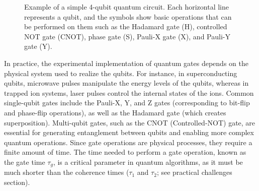 \documentclass{elbioimp2}
\begin{document}
\begin{figure}[h]
  \centering
  \caption{Example of a simple 4-qubit quantum circuit. Each horizontal line represents a qubit, and the symbols show basic operations that can be performed on them such as the Hadamard gate (H), controlled NOT gate (CNOT), phase gate (S), Pauli-X gate (X), and Pauli-Y gate (Y).}
\end{figure}


In practice, the experimental implementation of quantum gates depends on the physical system used to realize the qubits. For instance, in superconducting qubits, microwave pulses manipulate the energy levels of the qubits, whereas in trapped ion systems, laser pulses control the internal states of the ions. Common single-qubit gates include the Pauli-X, Y, and Z gates (corresponding to bit-flip and phase-flip operations), as well as the Hadamard gate (which creates superposition). Multi-qubit gates, such as the CNOT (Controlled-NOT) gate, are essential for generating entanglement between qubits and enabling more complex quantum operations. Since gate operations are physical processes, they require a finite amount of time. The time needed to perform a gate operation, known as the gate time $\tau_g$, is a critical parameter in quantum algorithms, as it must be much shorter than the coherence times ($\tau_1$ and $\tau_2$; see practical challenges section).
\end{document}
